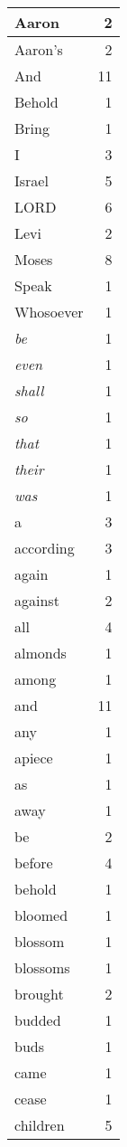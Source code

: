 \begin{center}
\begin{longtable}{l|r}
\hline \hline
\endlastfoot
Aaron & 2 \\ \hline
Aaron's & 2 \\ \hline
And & 11 \\ \hline
Behold & 1 \\ \hline
Bring & 1 \\ \hline
I & 3 \\ \hline
Israel & 5 \\ \hline
LORD & 6 \\ \hline
Levi & 2 \\ \hline
Moses & 8 \\ \hline
Speak & 1 \\ \hline
Whosoever & 1 \\ \hline
\emph{be} & 1 \\ \hline
\emph{even} & 1 \\ \hline
\emph{shall} & 1 \\ \hline
\emph{so} & 1 \\ \hline
\emph{that} & 1 \\ \hline
\emph{their} & 1 \\ \hline
\emph{was} & 1 \\ \hline
a & 3 \\ \hline
according & 3 \\ \hline
again & 1 \\ \hline
against & 2 \\ \hline
all & 4 \\ \hline
almonds & 1 \\ \hline
among & 1 \\ \hline
and & 11 \\ \hline
any & 1 \\ \hline
apiece & 1 \\ \hline
as & 1 \\ \hline
away & 1 \\ \hline
be & 2 \\ \hline
before & 4 \\ \hline
behold & 1 \\ \hline
bloomed & 1 \\ \hline
blossom & 1 \\ \hline
blossoms & 1 \\ \hline
brought & 2 \\ \hline
budded & 1 \\ \hline
buds & 1 \\ \hline
came & 1 \\ \hline
cease & 1 \\ \hline
children & 5 \\ \hline

\end{longtable}
\end{center}
